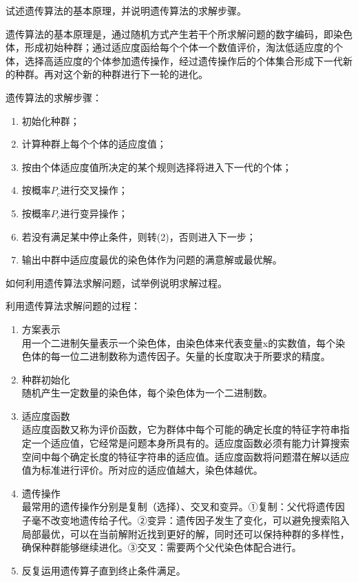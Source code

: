 \begin{question}
试述遗传算法的基本原理，并说明遗传算法的求解步骤。
\end{question}
\begin{solution}
遗传算法的基本原理是，通过随机方式产生若干个所求解问题的数字编码，即染色体，形成初始种群；通过适应度函给每个个体一个数值评价，淘汰低适应度的个体，选择高适应度的个体参加遗传操作，经过遗传操作后的个体集合形成下一代新的种群。再对这个新的种群进行下一轮的进化。\par
遗传算法的求解步骤：\par
	\begin{enumerate}
		\item 初始化种群；
		\item 计算种群上每个个体的适应度值；
		\item 按由个体适应度值所决定的某个规则选择将进入下一代的个体；
		\item 按概率$P_c$进行交叉操作；
		\item 按概率$P_c$进行变异操作；
		\item 若没有满足某中停止条件，则转(2)，否则进入下一步；
		\item 输出中群中适应度最优的染色体作为问题的满意解或最优解。
	\end{enumerate}
\end{solution}

\begin{question}
如何利用遗传算法求解问题，试举例说明求解过程。
\end{question}
\begin{solution}
利用遗传算法求解问题的过程：
\begin{enumerate}
	\item 方案表示	 \\
	用一个二进制矢量表示一个染色体，由染色体来代表变量x的实数值，每个染色体的每一位二进制数称为遗传因子。矢量的长度取决于所要求的精度。
	\item 种群初始化 \\
	随机产生一定数量的染色体，每个染色体为一个二进制数。
	\item 适应度函数 \\
	适应度函数又称为评价函数，它为群体中每个可能的确定长度的特征字符串指定一个适应值，它经常是问题本身所具有的。适应度函数必须有能力计算搜索空间中每个确定长度的特征字符串的适应值。适应度函数将问题潜在解以适应值为标准进行评价。所对应的适应值越大，染色体越优。
	\item 遗传操作 \\
最常用的遗传操作分别是复制（选择）、交叉和变异。①复制：父代将遗传因子毫不改变地遗传给子代。②变异：遗传因子发生了变化，可以避免搜索陷入局部最优，可以在当前解附近找到更好的解，同时还可以保持种群的多样性，确保种群能够继续进化。③交叉：需要两个父代染色体配合进行。
	\item 反复运用遗传算子直到终止条件满足。
\end{enumerate}
\end{solution}

